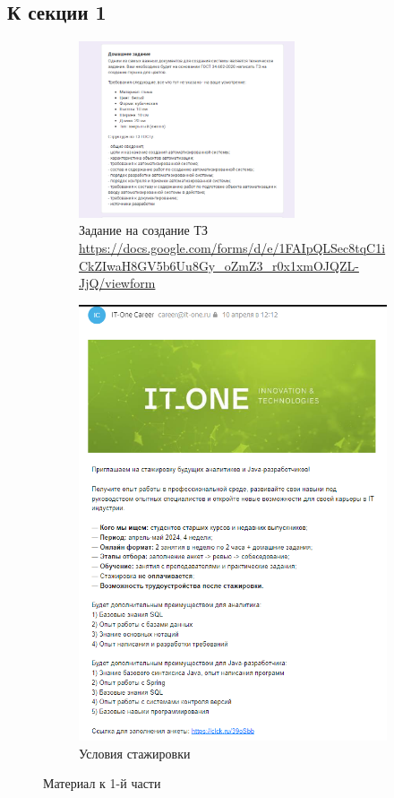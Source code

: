 \documentclass[16pt,a4paper]{article}
\begin{document}
\subsection{К секции 1}
\begin{figure}[H]
    \centering
    \begin{subfigure}{0.7\textwidth}
        \centering
        \includegraphics[width=0.7\textwidth]{изображение_2024-04-28_164154076.png}
        \caption{Задание на создание ТЗ \url{https://docs.google.com/forms/d/e/1FAIpQLSec8tqC1iCkZIwaH8GV5b6Uu8Gy_oZmZ3_r0x1xmOJQZL-JjQ/viewform}}
        \label{fig:first}
    \end{subfigure}    
    \qquad
    \begin{subfigure}{0.7\textwidth}
        \centering
        \includegraphics[width=0.7 \textwidth]{изображение_2024-04-28_164324326.png}
        \caption{Условия стажировки}
        \label{fig:second}
    \end{subfigure}    
    \caption{Материал к 1-й части}
    \label{fig:enter-label}
\end{figure}
\end{document}
